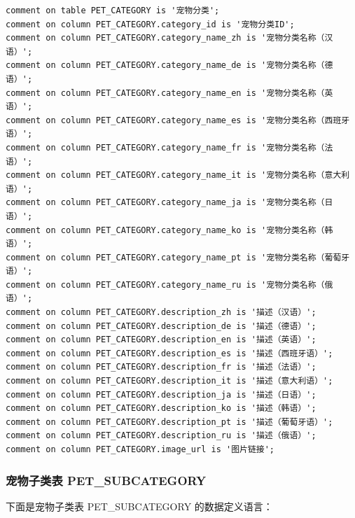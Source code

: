 \begin{verbatim}
comment on table PET_CATEGORY is '宠物分类';
comment on column PET_CATEGORY.category_id is '宠物分类ID';
comment on column PET_CATEGORY.category_name_zh is '宠物分类名称（汉语）';
comment on column PET_CATEGORY.category_name_de is '宠物分类名称（德语）';
comment on column PET_CATEGORY.category_name_en is '宠物分类名称（英语）';
comment on column PET_CATEGORY.category_name_es is '宠物分类名称（西班牙语）';
comment on column PET_CATEGORY.category_name_fr is '宠物分类名称（法语）';
comment on column PET_CATEGORY.category_name_it is '宠物分类名称（意大利语）';
comment on column PET_CATEGORY.category_name_ja is '宠物分类名称（日语）';
comment on column PET_CATEGORY.category_name_ko is '宠物分类名称（韩语）';
comment on column PET_CATEGORY.category_name_pt is '宠物分类名称（葡萄牙语）';
comment on column PET_CATEGORY.category_name_ru is '宠物分类名称（俄语）';
comment on column PET_CATEGORY.description_zh is '描述（汉语）';
comment on column PET_CATEGORY.description_de is '描述（德语）';
comment on column PET_CATEGORY.description_en is '描述（英语）';
comment on column PET_CATEGORY.description_es is '描述（西班牙语）';
comment on column PET_CATEGORY.description_fr is '描述（法语）';
comment on column PET_CATEGORY.description_it is '描述（意大利语）';
comment on column PET_CATEGORY.description_ja is '描述（日语）';
comment on column PET_CATEGORY.description_ko is '描述（韩语）';
comment on column PET_CATEGORY.description_pt is '描述（葡萄牙语）';
comment on column PET_CATEGORY.description_ru is '描述（俄语）';
comment on column PET_CATEGORY.image_url is '图片链接';
\end{verbatim}

\subsubsection{宠物子类表 PET\_SUBCATEGORY}

下面是宠物子类表 PET\_SUBCATEGORY 的数据定义语言：

